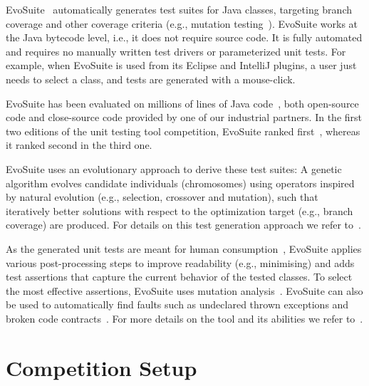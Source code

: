 \documentclass{sig-alternate}
\newcommand{\EVOSUITE}{{\sc EvoSuite}\xspace}
\begin{document}
\EVOSUITE~\cite{FrA11c,GoA_TSE12} automatically generates test suites
for Java classes, targeting branch coverage and other coverage
criteria (e.g., mutation testing~\cite{emse14_mutation}). \EVOSUITE
works at the Java bytecode level, i.e., it does not require source
code. It is fully automated and requires no manually written test
drivers or parameterized unit tests.  For example, when \EVOSUITE is
used from its Eclipse and IntelliJ plugins, a user
just needs to select a class, and tests are generated with a mouse-click.

\EVOSUITE has been evaluated on millions of lines of Java
code~\cite{fraser2014large}, both open-source code and close-source
code provided by one of our industrial partners.  In the first two
editions of the unit testing tool competition, \EVOSUITE ranked
first~\cite{evosuiteAtSbst2013,evosuiteAtFittest2013}, whereas it
ranked second in the third one.


\EVOSUITE uses an evolutionary approach to derive these test suites: A
genetic algorithm evolves candidate individuals (chromosomes) using
operators inspired by natural evolution (e.g., selection, crossover
and mutation), such that iteratively better solutions with respect to
the optimization target (e.g., branch coverage) are produced.  For
details on this test generation approach we refer to~\cite{GoA_TSE12}.


As the generated unit tests are meant for human
consumption~\cite{fraser2013does}, \EVOSUITE applies various
post-processing steps to improve readability (e.g., minimising) and
adds test assertions that capture the current behavior of the tested
classes. To select the most effective assertions, \EVOSUITE uses
mutation analysis~\cite{10.1109/TSE.2011.93}.  \EVOSUITE can also be
used to automatically find faults such as undeclared thrown exceptions
and broken code contracts~\cite{emse13_oracle}.  For more details on
the tool and its abilities we refer to~\cite{FrA11c,FrA13a}.

\section{Competition Setup}
\end{document}
